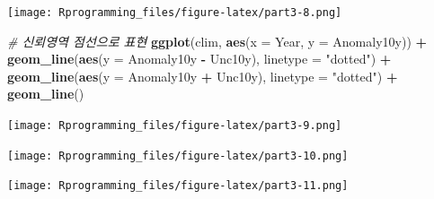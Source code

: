 \documentclass[10pt,]{krantz}
\makeatletter
\newenvironment{Shaded}{\begin{snugshade}}{\end{snugshade}}
\newcommand{\KeywordTok}[1]{\textcolor[rgb]{0.13,0.29,0.53}{\textbf{#1}}}
\newcommand{\DataTypeTok}[1]{\textcolor[rgb]{0.13,0.29,0.53}{#1}}
\newcommand{\StringTok}[1]{\textcolor[rgb]{0.31,0.60,0.02}{#1}}
\newcommand{\CommentTok}[1]{\textcolor[rgb]{0.56,0.35,0.01}{\textit{#1}}}
\newcommand{\OperatorTok}[1]{\textcolor[rgb]{0.81,0.36,0.00}{\textbf{#1}}}
\newcommand{\NormalTok}[1]{#1}
\newenvironment{kframe}{%
\medskip{}
\setlength{\fboxsep}{.8em}
 \def\at@end@of@kframe{}%
 \ifinner\ifhmode%
  \def\at@end@of@kframe{\end{minipage}}%
  \begin{minipage}{\columnwidth}%
 \fi\fi%
 \def\FrameCommand##1{\hskip\@totalleftmargin \hskip-\fboxsep
 \colorbox{shadecolor}{##1}\hskip-\fboxsep
     \hskip-\linewidth \hskip-\@totalleftmargin \hskip\columnwidth}%
 \MakeFramed {\advance\hsize-\width
   \@totalleftmargin\z@ \linewidth\hsize
   \@setminipage}}%
 {\par\unskip\endMakeFramed%
 \at@end@of@kframe}
\renewenvironment{Shaded}{\begin{kframe}}{\end{kframe}}
\theoremstyle{definition}
\theoremstyle{definition}
\theoremstyle{remark}
\makeatother
\begin{document}
\texttt{[image: Rprogramming\_files/figure-latex/part3-8.png]}

\begin{Shaded}
\begin{Highlighting}[]


\CommentTok{# 신뢰영역 점선으로 표현}
\KeywordTok{ggplot}\NormalTok{(clim, }\KeywordTok{aes}\NormalTok{(}\DataTypeTok{x =}\NormalTok{ Year, }\DataTypeTok{y =}\NormalTok{ Anomaly10y)) }\OperatorTok{+}\StringTok{ }
\StringTok{  }\KeywordTok{geom_line}\NormalTok{(}\KeywordTok{aes}\NormalTok{(}\DataTypeTok{y =}\NormalTok{ Anomaly10y }\OperatorTok{-}\StringTok{ }\NormalTok{Unc10y), }\DataTypeTok{linetype =} \StringTok{"dotted"}\NormalTok{) }\OperatorTok{+}
\StringTok{  }\KeywordTok{geom_line}\NormalTok{(}\KeywordTok{aes}\NormalTok{(}\DataTypeTok{y =}\NormalTok{ Anomaly10y }\OperatorTok{+}\StringTok{ }\NormalTok{Unc10y), }\DataTypeTok{linetype =} \StringTok{"dotted"}\NormalTok{) }\OperatorTok{+}
\StringTok{  }\KeywordTok{geom_line}\NormalTok{()}
\end{Highlighting}
\end{Shaded}

\texttt{[image: Rprogramming\_files/figure-latex/part3-9.png]}

\begin{Shaded}
\end{Shaded}

\texttt{[image: Rprogramming\_files/figure-latex/part3-10.png]}

\begin{Shaded}
\end{Shaded}

\texttt{[image: Rprogramming\_files/figure-latex/part3-11.png]}
\end{document}
